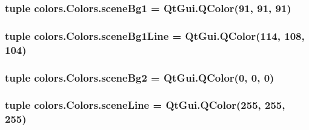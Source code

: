 \subsubsection[{scene\+Bg1}]{\setlength{\rightskip}{0pt plus 5cm}tuple colors.\+Colors.\+scene\+Bg1 = Qt\+Gui.\+Q\+Color(91, 91, 91)\hspace{0.3cm}{\ttfamily [static]}}\label{classcolors_1_1Colors_a07819baa8c69647aaa2da48054611c1b}
\hypertarget{classcolors_1_1Colors_aa233072a8580962ccd11d4c5879ce477}{}
\subsubsection[{scene\+Bg1\+Line}]{\setlength{\rightskip}{0pt plus 5cm}tuple colors.\+Colors.\+scene\+Bg1\+Line = Qt\+Gui.\+Q\+Color(114, 108, 104)\hspace{0.3cm}{\ttfamily [static]}}\label{classcolors_1_1Colors_aa233072a8580962ccd11d4c5879ce477}
\hypertarget{classcolors_1_1Colors_af11d9ba2e00592e5d6542c1a6c0db312}{}
\subsubsection[{scene\+Bg2}]{\setlength{\rightskip}{0pt plus 5cm}tuple colors.\+Colors.\+scene\+Bg2 = Qt\+Gui.\+Q\+Color(0, 0, 0)\hspace{0.3cm}{\ttfamily [static]}}\label{classcolors_1_1Colors_af11d9ba2e00592e5d6542c1a6c0db312}
\hypertarget{classcolors_1_1Colors_a1a8a51f3d21fdaf1fbdeaee0eceee099}{}
\subsubsection[{scene\+Line}]{\setlength{\rightskip}{0pt plus 5cm}tuple colors.\+Colors.\+scene\+Line = Qt\+Gui.\+Q\+Color(255, 255, 255)\hspace{0.3cm}{\ttfamily [static]}}\label{classcolors_1_1Colors_a1a8a51f3d21fdaf1fbdeaee0eceee099}
\hypertarget{classcolors_1_1Colors_a919ae07b679efc2497cf19ae270e2d87}{}
